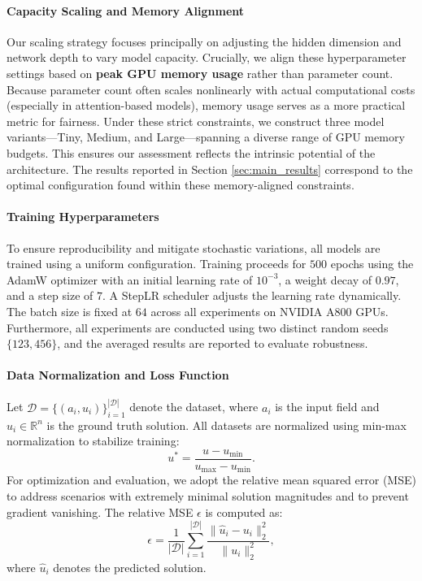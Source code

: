 \documentclass[final,3p,times]{elsarticle}
\begin{document}
\paragraph{Capacity Scaling and Memory Alignment}
Our scaling strategy focuses principally on adjusting the hidden dimension and network depth to vary model capacity. Crucially, we align these hyperparameter settings based on \textbf{peak GPU memory usage} rather than parameter count. Because parameter count often scales nonlinearly with actual computational costs (especially in attention-based models), memory usage serves as a more practical metric for fairness. Under these strict constraints, we construct three model variants—Tiny, Medium, and Large—spanning a diverse range of GPU memory budgets. This ensures our assessment reflects the intrinsic potential of the architecture. The results reported in Section \ref{sec:main_results} correspond to the optimal configuration found within these memory-aligned constraints.

\paragraph{Training Hyperparameters}
To ensure reproducibility and mitigate stochastic variations, all models are trained using a uniform configuration. Training proceeds for $500$ epochs using the AdamW optimizer \cite{loshchilov2017decoupled} with an initial learning rate of $10^{-3}$, a weight decay of $0.97$, and a step size of $7$. A StepLR scheduler adjusts the learning rate dynamically. The batch size is fixed at $64$ across all experiments on NVIDIA A800 GPUs. Furthermore, all experiments are conducted using two distinct random seeds $\{123, 456\}$, and the averaged results are reported to evaluate robustness.

\paragraph{Data Normalization and Loss Function}
Let $\mathcal{D} = \{ (a_i, u_i) \}_{i=1}^{|\mathcal{D}|}$ denote the dataset, where $a_i$ is the input field and $u_i \in \mathbb{R}^{n}$ is the ground truth solution. All datasets are normalized using min-max normalization to stabilize training:
\begin{equation}
u^* = \frac{u - u_{\text{min}}}{u_{\text{max}} - u_{\text{min}}}.
\label{eq:minmax_norm}
\end{equation}
For optimization and evaluation, we adopt the relative mean squared error (MSE) to address scenarios with extremely minimal solution magnitudes and to prevent gradient vanishing. The relative MSE $\epsilon$ is computed as:
\begin{equation}
\epsilon = \frac{1}{|\mathcal{D}|} \sum_{i=1}^{|\mathcal{D}|} \frac{\| \hat{u}_i - u_i \|_2^2}{\| u_i \|_2^2},
\label{eq:relative_mse}
\end{equation}
where $\hat{u}_i$ denotes the predicted solution.
\end{document}
